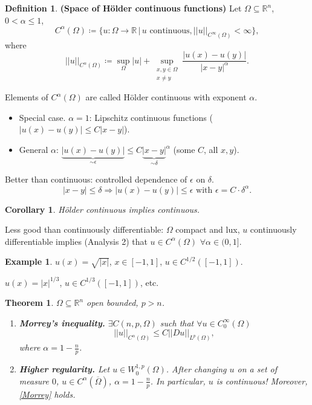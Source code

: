 \documentclass[12pt]{article}
\newtheorem{theorem}{Theorem}[section]
\newtheorem{corollary}{Corollary}[section]
\theoremstyle{definition}
\newtheorem*{definition*}{Definition}
\newtheorem*{example*}{Example}
\begin{document}
\begin{definition*}
\textbf{(Space of H\"{o}lder continuous functions)} Let $\Omega\subseteq\mathbb{R}^n$, $0<\alpha\leq1$,
\[C^{\alpha}(\Omega)\coloneqq\{u:\Omega\rightarrow\mathbb{R}\,|\,u\text{ continuous},||u||_{C^{\infty}(\Omega)}<\infty\},\]
where
\[||u||_{C^{\alpha}(\Omega)}\coloneqq\sup_{\Omega}|u|+\sup_{\substack{x,y\in\Omega\\x\neq y}}\frac{\big|u(x)-u(y)\big|}{|x-y|^{\alpha}}.\]

Elements of $C^{\alpha}(\Omega)$ are called H\"{o}lder continuous with exponent $\alpha$.

\begin{itemize}
\item Special case. $\alpha=1$: Lipschitz continuous functions ($|u(x)-u(y)|\leq C|x-y|$).

\item General $\alpha$: $\underbrace{|u(x)-u(y)|}_{\sim\epsilon}\leq C{\underbrace{|x-y|}_{\sim\delta}}^{\alpha}$ (some $C$, all $x,y$).
\end{itemize}
\end{definition*}

Better than continuous: controlled dependence of $\epsilon$ on $\delta$.
\[|x-y|\leq\delta\Rightarrow\big|u(x)-u(y)\big|\leq\epsilon\text{ with }\epsilon=C\cdot\delta^{\alpha}.\]

\begin{corollary}
H\"{o}lder continuous implies continuous.
\end{corollary}

Less good than continuously differentiable: $\Omega$ compact and lux, $u$ continuously differentiable implies (Analysis 2) that $u\in C^{\alpha}(\Omega)$ $\forall\alpha\in(0,1]$.

\begin{example*}
$u(x)=\sqrt{|x|}$, $x\in[-1,1]$, $u\in C^{1/2}([-1,1])$.

$u(x)=|x|^{1/3}$, $u\in C^{1/3}([-1,1])$, etc.
\end{example*}

\begin{theorem}\label{Morrey_higher_regularity}
$\Omega\subseteq\mathbb{R}^n$ open bounded, $p>n$.

\begin{enumerate}[label=\alph*)]
\item \textbf{Morrey's inequality.} $\exists C(n,p,\Omega)$ such that $\forall u\in C_0^{\infty}(\Omega)$
\begin{equation}\tag{M}\label{Morrey}
||u||_{C^{\alpha}(\Omega)}\leq C||Du||_{L^p(\Omega)},
\end{equation}
where $\alpha=1-\frac{n}{p}$.

\item\label{higher_regularity} \textbf{Higher regularity.} Let $u\in W_0^{1,p}(\Omega)$. After changing $u$ on a set of measure $0$, $u\in C^{\alpha}(\overline{\Omega})$, $\alpha=1-\frac{n}{p}$. In particular, $u$ is continuous! Moreover, \eqref{Morrey} holds.
\end{enumerate}
\end{theorem}
\end{document}
